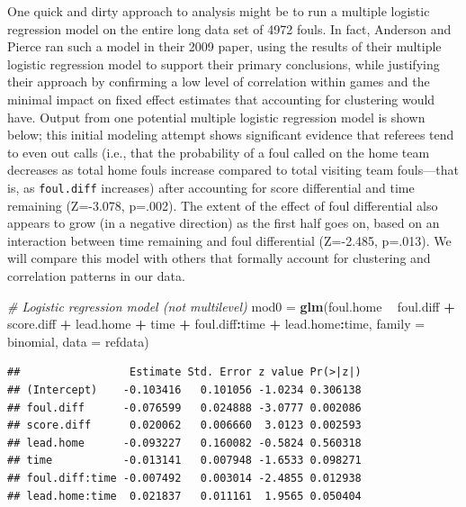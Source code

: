 \documentclass[
]{krantz}
\newenvironment{Shaded}{\begin{snugshade}}{\end{snugshade}}
\newcommand{\CommentTok}[1]{\textcolor[rgb]{0.37,0.37,0.37}{\textit{#1}}}
\newcommand{\DataTypeTok}[1]{\textcolor[rgb]{0.27,0.27,0.27}{#1}}
\newcommand{\KeywordTok}[1]{\textcolor[rgb]{0.27,0.27,0.27}{\textbf{#1}}}
\newcommand{\NormalTok}[1]{#1}
\newcommand{\OperatorTok}[1]{\textcolor[rgb]{0.43,0.43,0.43}{\textbf{#1}}}
\newcommand{\StringTok}[1]{\textcolor[rgb]{0.5,0.5,0.5}{#1}}
\begin{document}
One quick and dirty approach to analysis might be to run a multiple logistic regression model on the entire long data set of 4972 fouls. In fact, Anderson and Pierce ran such a model in their 2009 paper, using the results of their multiple logistic regression model to support their primary conclusions, while justifying their approach by confirming a low level of correlation within games and the minimal impact on fixed effect estimates that accounting for clustering would have. Output from one potential multiple logistic regression model is shown below; this initial modeling attempt shows significant evidence that referees tend to even out calls (i.e., that the probability of a foul called on the home team decreases as total home fouls increase compared to total visiting team fouls---that is, as \texttt{foul.diff} increases) after accounting for score differential and time remaining (Z=-3.078, p=.002). The extent of the effect of foul differential also appears to grow (in a negative direction) as the first half goes on, based on an interaction between time remaining and foul differential (Z=-2.485, p=.013). We will compare this model with others that formally account for clustering and correlation patterns in our data.

\begin{Shaded}
\begin{Highlighting}[]
\CommentTok{# Logistic regression model (not multilevel)}
\NormalTok{mod0 =}\StringTok{ }\KeywordTok{glm}\NormalTok{(foul.home }\OperatorTok{~}\StringTok{ }\NormalTok{foul.diff }\OperatorTok{+}\StringTok{ }\NormalTok{score.diff }\OperatorTok{+}\StringTok{ }\NormalTok{lead.home }\OperatorTok{+}\StringTok{ }
\StringTok{           }\NormalTok{time }\OperatorTok{+}\StringTok{ }\NormalTok{foul.diff}\OperatorTok{:}\NormalTok{time }\OperatorTok{+}\StringTok{ }\NormalTok{lead.home}\OperatorTok{:}\NormalTok{time, }
           \DataTypeTok{family =}\NormalTok{ binomial, }\DataTypeTok{data =}\NormalTok{ refdata)}
\end{Highlighting}
\end{Shaded}

\begin{verbatim}
##                 Estimate Std. Error z value Pr(>|z|)
## (Intercept)    -0.103416   0.101056 -1.0234 0.306138
## foul.diff      -0.076599   0.024888 -3.0777 0.002086
## score.diff      0.020062   0.006660  3.0123 0.002593
## lead.home      -0.093227   0.160082 -0.5824 0.560318
## time           -0.013141   0.007948 -1.6533 0.098271
## foul.diff:time -0.007492   0.003014 -2.4855 0.012938
## lead.home:time  0.021837   0.011161  1.9565 0.050404
\end{verbatim}
\end{document}
